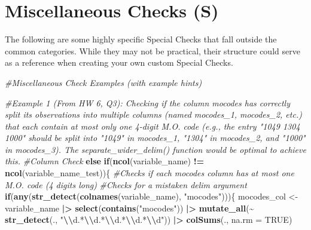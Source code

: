 \documentclass[
  12pt,
]{book}
\newenvironment{Shaded}{\begin{snugshade}}{\end{snugshade}}
\newcommand{\AttributeTok}[1]{\textcolor[rgb]{0.13,0.29,0.53}{#1}}
\newcommand{\CommentTok}[1]{\textcolor[rgb]{0.56,0.35,0.01}{\textit{#1}}}
\newcommand{\ConstantTok}[1]{\textcolor[rgb]{0.56,0.35,0.01}{#1}}
\newcommand{\ControlFlowTok}[1]{\textcolor[rgb]{0.13,0.29,0.53}{\textbf{#1}}}
\newcommand{\FunctionTok}[1]{\textcolor[rgb]{0.13,0.29,0.53}{\textbf{#1}}}
\newcommand{\NormalTok}[1]{#1}
\newcommand{\OtherTok}[1]{\textcolor[rgb]{0.56,0.35,0.01}{#1}}
\newcommand{\SpecialCharTok}[1]{\textcolor[rgb]{0.81,0.36,0.00}{\textbf{#1}}}
\newcommand{\StringTok}[1]{\textcolor[rgb]{0.31,0.60,0.02}{#1}}
\begin{document}
\section{Miscellaneous Checks (S)}\label{Miscellaneous-Check}

The following are some highly specific Special Checks that fall outside the common categories. While they may not be practical, their structure could serve as a reference when creating your own custom Special Checks.

\begin{Shaded}
\begin{Highlighting}[]
\CommentTok{\#Miscellaneous Check Examples (with example hints)}

\CommentTok{\#Example 1 (From HW 6, Q3): Checking if the column \textasciigrave{}mocodes\textasciigrave{} has correctly split its observations into multiple columns (named \textasciigrave{}mocodes\_1\textasciigrave{}, \textasciigrave{}mocodes\_2\textasciigrave{}, etc.) that each contain at most only one 4{-}digit M.O. code (e.g., the entry "1049 1304 1000" should be split into "1049" in \textasciigrave{}mocodes\_1\textasciigrave{}, "1304" in \textasciigrave{}mocodes\_2\textasciigrave{}, and "1000" in \textasciigrave{}mocodes\_3\textasciigrave{}). The \textasciigrave{}separate\_wider\_delim()\textasciigrave{} function would be optimal to achieve this. }
\CommentTok{\#Column Check }
\ControlFlowTok{else} \ControlFlowTok{if}\NormalTok{(}\FunctionTok{ncol}\NormalTok{(variable\_name) }\SpecialCharTok{!=} \FunctionTok{ncol}\NormalTok{(variable\_name\_test))\{ }
  \CommentTok{\#Checks if each mocodes column has at most one M.O. code (4 digits long)}
  \CommentTok{\#Checks for a mistaken \textasciigrave{}delim\textasciigrave{} argument}
  \ControlFlowTok{if}\NormalTok{(}\FunctionTok{any}\NormalTok{(}\FunctionTok{str\_detect}\NormalTok{(}\FunctionTok{colnames}\NormalTok{(variable\_name), }\StringTok{"mocodes"}\NormalTok{)))\{}
\NormalTok{    mocodes\_col }\OtherTok{\textless{}{-}}\NormalTok{ variable\_name }\SpecialCharTok{|\textgreater{}} \FunctionTok{select}\NormalTok{(}\FunctionTok{contains}\NormalTok{(}\StringTok{"mocodes"}\NormalTok{)) }\SpecialCharTok{|\textgreater{}} \FunctionTok{mutate\_all}\NormalTok{(}\SpecialCharTok{\textasciitilde{}} \FunctionTok{str\_detect}\NormalTok{(., }\StringTok{"}\SpecialCharTok{\textbackslash{}\textbackslash{}}\StringTok{d.*}\SpecialCharTok{\textbackslash{}\textbackslash{}}\StringTok{d.*}\SpecialCharTok{\textbackslash{}\textbackslash{}}\StringTok{d.*}\SpecialCharTok{\textbackslash{}\textbackslash{}}\StringTok{d.*}\SpecialCharTok{\textbackslash{}\textbackslash{}}\StringTok{d"}\NormalTok{)) }\SpecialCharTok{|\textgreater{}} \FunctionTok{colSums}\NormalTok{(., }\AttributeTok{na.rm =} \ConstantTok{TRUE}\NormalTok{)}

\end{Highlighting}
\end{Shaded}
\end{document}
